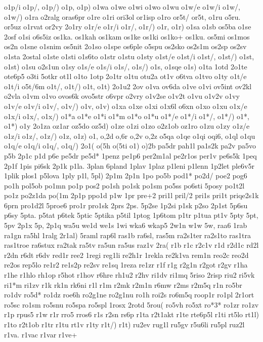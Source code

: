 {{o1p/i
o1p/,
o1p/)
o1p,
o1p)
o1wa
o1we
o1wi
o1wo
o1wu
o1w/e
o1w/i
o1w/,
o1w/)
o1ra
o2ralg
oras6pr
o1re
o1ri
ori3ol
or1isp
o1ro
or5t/
or5t,
o1ru
o5ru.
or5uz
o1rvat
or2vy
2o1ry
o1r/e
o1r/i
o1r/,
o1r/)
o1r,
o1r)
o1sa
o1sb
os5ba
o1se
2osf
o1si
o6s5iz
os1ka.
os1kah
os1kam
os1ke
os1ki
os1ko+
os1ku.
os5mi
os1mos
os2n
o1sne
o1snim
os5nit
2o1so
o1spe
os6ple
o5spu
os2sko
os2s1m
os2sp
os2sv
o1sta
2ostal
o1ste
o1sti
o1s6to
o1str
o1stu
o1sty
o1st/e
o1st/i
o1st/,
o1st/)
o1st,
o1st)
o1su
o2s1un
o1sy
o1s/e
o1s/i
o1s/,
o1s/)
o1s,
o1sqe
o1s)
o1ta
1otd
2o1te
ote6p5
o3ti
5otkr
ot1l
o1to
1otp
2o1tr
o1tu
otu2a
ot1v
o6tva
o1tvo
o1ty
o1t/e
o1t/i
o5t/6m
o1t/,
o1t/)
o1t,
o1t)
2o1u2
2ov
o1va
ov6da
o1ve
o1vi
ov5int
ov2kl
o2vla
o1vm
o1vo
ovos6k
ovo5str
o6vpr
o2vry
o1v2se
o1v2t
o1vu
o1v2v
o1vy
o1v/e
o1v/i
o1v/,
o1v/)
o1v,
o1v)
o1xa
o1xe
o1xi
o1x6l
o6xn
o1xo
o1xu
o1x/e
o1x/i
o1x/,
o1x/)
o1*a
o1*e
o1*i
o1*m
o1*o
o1*u
o1*/e
o1*/i
o1*/,
o1*/)
o1*,
o1*)
o1y
2o1za
oz1ar
oz5do
oz5d)
o1ze
o1zi
o1zo
o2z1ob
oz1ro
o1zu
o1zy
o1z/e
o1z/i
o1z/,
o1z/)
o1z,
o1z)
o1,
o,2d
o,6r
o,2v
o,2z
o5qa
o1qe
o1qi
oqi6,
o1ql
o1qu
o1q/e
o1q/i
o1q/,
o1q/)
2o1(
o(5h
o(5ti
o1)
o)2b
pa5dr
pah1l
pa1s2k
pa2v
pa5vo
p5b
2p1c
p1d
p6e
pe5dr
pe5d*
1penz
pe1p6
per2m1al
pe2r1os
per1v
pe6s5k
1peq
2p1f
1pis
pi6sk
2p1k
p1la.
3plan
6pland
1plav
1plaz
p1leni
p1lenn
1p2let
ple6v5r
1plik
plos1
p5lova
1ply
p1l,
5pl)
2p1m
2p1n
1po
po5b
pod1*
po2d/
poe2
pog6
po1h
pol5ob
po1mn
po1p
pos2
po1sh
po1sk
po1sm
po5ss
po6sti
5posy
po1t2l
po1z
po2z1da
po(1m
2p1p
ppo1d
p1w
1pr
pre+2
pri1l
pril/2
pri1s
pri1t
priqe2s1k
6prn
pro1d2l
5proe6
pro1r
pro1sk
2prs
2ps.
5p2se
1p2si
p1sk
p2so
2p1st
5p6su
p6sy
5pta.
p5tat
p6tek
5ptic
5ptika
p5til
1ptog
1p6tom
p1tr
p1tua
pt1v
5pty
5pt,
5pv
2p1x
5p,
2p1q
wa5u
we1d
we1s
1wi
wka6
wkap5
2w1n
w1w
5w,
raa6
1rab
ra1gn
ra5hl
1ralg
2r1al)
5raml
rap6l
ras1b
ra6sl,
ras5m
ra2s1ter
ra2s1to
ras1tra
ras1troe
ra6stux
ra2tak
ra5tv
ra5un
ra5us
raz1v
2ra(
r1b
r1c
r2c1v
r1d
r2d1c
rd2l
r2dn
r6dt
r6dv
red1r
ree2
1regi
reg1li
re2h1r
1rekla
re2k1va
rem1n
reo2c
reo2d
re2os
rep5lo
re1r2
re1s2p
re2sv
re1sq
1reza
re1zr
r1f
r1g
r2g1n
r2got
r2gv
r1ha
r1he
r1hlo
rh1op
r5hot
r1hov
r6hre
rh1u2
r2hv
ri1dv
ri1mq
5riso
2risp
riu2
ri5vk
ri1*m
ri1zv
r1k
rk1n
rk6ni
r1l
r1m
r2mk
r2m1n
r6mw
r2ms
r2m5q
r1n
ro5br
ro1dv
ro5d*
ro1dz
roe6h
ro2g1ne
ro2g1nu
ro1h
roi2s
ro6m5q
roop1r
ro1pl
2r1ort
ro5sc
ro1sm
ro5snu
ro5spa
ro5spl
1rosx
2rotd
5rou(
ro5vh
ro5xt
ro*3*
ro1zr
ro1zv
r1p
rpus5
r1w
r1r
rro5
rros6
r1s
r2sn
rs6p
r1ta
r2t1akt
r1te
rte6p5l
r1ti
rt5lo
rt1l)
r1to
r2t1ob
r1tr
r1tu
rt1v
r1ty
r1t/)
r1t)
ru2ev
rug1l
ru5gv
r5u6li
ru5pl
ruz2l
r1va.
r1vac
r1var
r1ve+
}}
